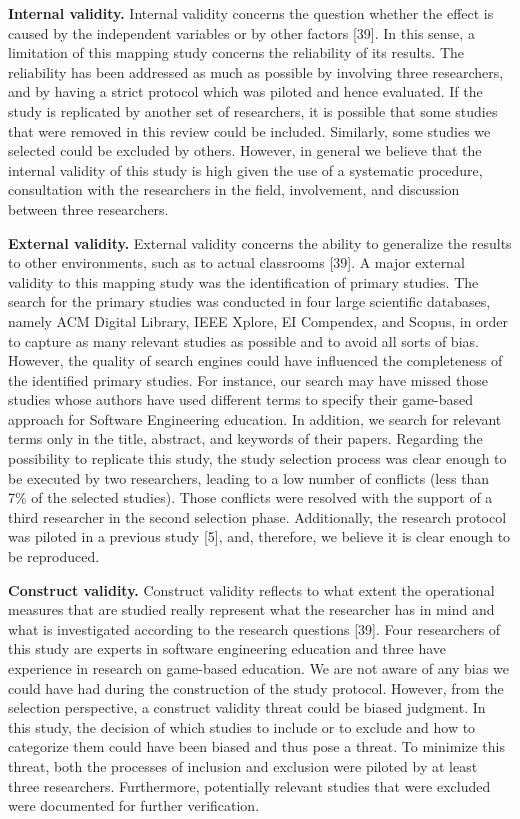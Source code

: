 \textbf{Internal validity.} Internal validity concerns the question whether the effect is caused by the independent variables or by other factors \citep{Wohlin:2012}[39]. In this sense, a limitation of this mapping study concerns the reliability of its results. The reliability has been addressed as much as possible by involving three researchers, and by having a strict protocol which was piloted and hence evaluated. If the study is replicated by another set of researchers, it is possible that some studies that were removed in this review could be included. Similarly, some studies we selected could be excluded by others. However, in general we believe that the internal validity of this study is high given the use of a systematic procedure, consultation with the researchers in the field, involvement, and discussion between three researchers.

\textbf{External validity.} External validity concerns the ability to generalize the results to other environments, such as to actual classrooms \citep{Wohlin:2012}[39]. A major external validity to this mapping study was the identification of primary studies. The search for the primary studies was conducted in four large scientific databases, namely ACM Digital Library, IEEE Xplore, EI Compendex, and Scopus, in order to capture as many relevant studies as possible and to avoid all sorts of bias. However, the quality of search engines could have influenced the completeness of the identified primary studies. For instance, our search may have missed those studies whose authors have used different terms to specify their game-based approach for Software Engineering education. In addition, we search for relevant terms only in the title, abstract, and keywords of their papers. Regarding the possibility to replicate this study, the study selection process was clear enough to be executed by two researchers, leading to a low number of conflicts (less than 7\% of the selected studies). Those conflicts were resolved with the support of a third researcher in the second selection phase. Additionally, the research protocol was piloted in a previous study [5], and, therefore, we believe it is clear enough to be reproduced. 

\textbf{Construct validity.} Construct validity reflects to what extent the operational measures that are studied really represent what the researcher has in mind and what is investigated according to the research questions [39]. Four researchers of this study are experts in software engineering education and three have experience in research on game-based education. We are not aware of any bias we could have had during the construction of the study protocol. However, from the selection perspective, a construct validity threat could be biased judgment. In this study, the decision of which studies to include or to exclude and how to categorize them could have been biased and thus pose a threat. To minimize this threat, both the processes of inclusion and exclusion were piloted by at least three researchers. Furthermore, potentially relevant studies that were excluded were documented for further verification. 

